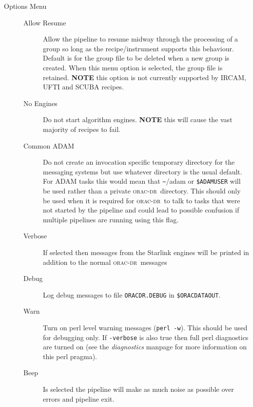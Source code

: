 \documentclass[twoside,11pt]{article}
\renewcommand{\_}{\texttt{\symbol{95}}}
\newcommand{\oracdr}{\textsc{orac-dr}}
\begin{document}
\begin{description}
\begin{description}
\end{description}
\item[Options Menu] \mbox{}\begin{description}
\item[Allow Resume] \mbox{}

Allow the pipeline to resume midway through the processing of a group
so long as the recipe/instrument supports this behaviour. Default is
for the group file to be deleted when a new group is created. When
this menu option is selected, the group file is retained. \textbf{NOTE} this
option is not currently supported by IRCAM, UFTI and SCUBA recipes.

\item[No Engines] \mbox{}

Do not start algorithm engines. \textbf{NOTE} this will cause the vast
majority of recipes to fail.

\item[Common ADAM] \mbox{}

Do not create an invocation specific temporary directory for the
messaging systems but use whatever directory is the usual default. For
ADAM tasks this would mean that \texttt{\~{}}/adam or \texttt{\$ADAM\_USER} will be used
rather than a private \oracdr\ directory. This should only be used when
it is required for \oracdr\ to talk to tasks that were not started by
the pipeline and could lead to possible confusion if multiple
pipelines are running using this flag.

\item[Verbose] \mbox{}

If selected then messages from the Starlink engines will be printed in
addition to the normal \oracdr\ messages

\item[Debug] \mbox{}

Log debug messages to file \texttt{ORACDR.DEBUG} in \texttt{\$ORAC\_DATA\_OUT}.

\item[Warn] \mbox{}

Turn on perl level warning messages (\texttt{perl -w}). This should be used
for debugging only. If \texttt{-verbose} is also true then full perl
diagnostics are turned on (see the \emph{diagnostics} manpage for more information on
this perl pragma).

\item[Beep] \mbox{}

Is selected the pipeline will make as much noise as possible over
errors and pipeline exit.


\end{description}
\end{description}
\end{document}
